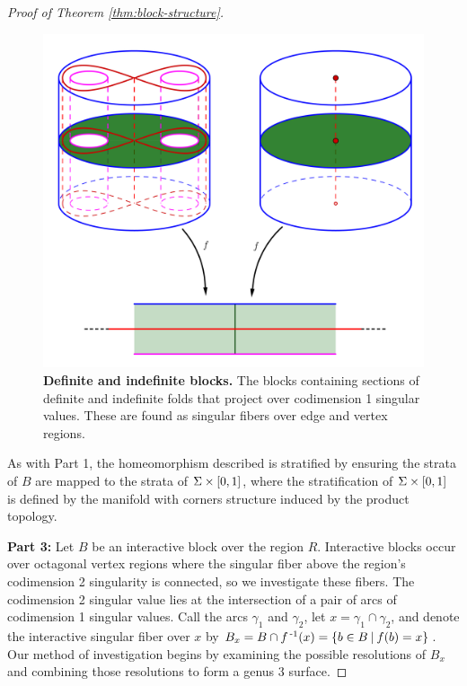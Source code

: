 \begin{proof}[Proof of Theorem \ref{thm:block-structure}]
	\begin{figure}[h]
		\centering
		\includegraphics[width=\textwidth]{figures/codim-1-blocks.png}
		\caption{
			\textbf{Definite and indefinite blocks.}
			The blocks containing sections of definite and indefinite folds that project over codimension 1 singular values.
			These are found as singular fibers over edge and vertex regions.
		}
		\label{fig:codim-1-blocks}
	\end{figure}

	As with Part 1, the homeomorphism described is stratified by ensuring the strata of $B$ are mapped to the strata of $\Sigma \times [0,1]$, where the stratification of $\Sigma \times [0,1]$ is defined by the manifold with corners structure induced by the product topology.
	
	\textbf{Part 3:}	
	Let $B$ be an interactive block over the region $R$.
	Interactive blocks occur over octagonal vertex regions where the singular fiber above the region's codimension 2 singularity is connected, so we investigate these fibers.
	The codimension 2 singular value lies at the intersection of a pair of arcs of codimension 1 singular values.
	Call the arcs $\gamma_1$ and $\gamma_2$, let $x = \gamma_1\cap \gamma_2$, and denote the interactive singular fiber over $x$ by $B_x = B\cap f^{\,\text{-}1}(x) = \{b\in B\:|\:f(b)=x\}$.
	Our method of investigation begins by examining the possible resolutions of $B_x$ and combining those resolutions to form a genus 3 surface.
	 

\end{proof}
